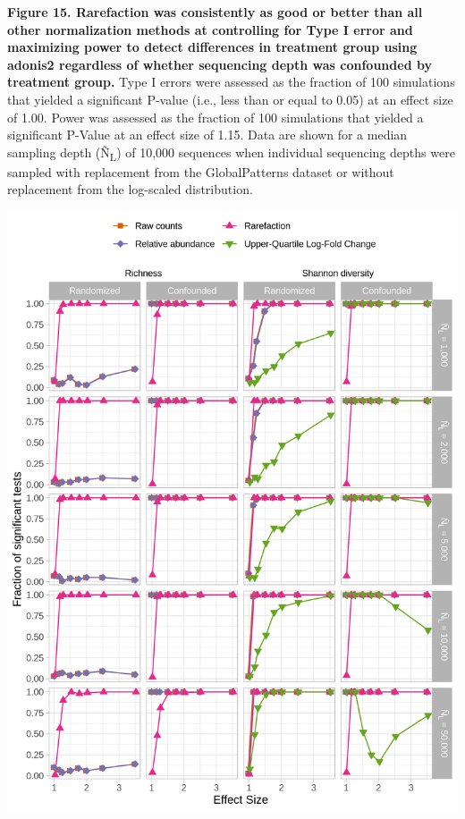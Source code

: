 \documentclass[
]{article}
\begin{document}
\textbf{Figure 15. Rarefaction was consistently as good or better than
all other normalization methods at controlling for Type I error and
maximizing power to detect differences in treatment group using adonis2
regardless of whether sequencing depth was confounded by treatment
group.} Type I errors were assessed as the fraction of 100 simulations
that yielded a significant P-value (i.e., less than or equal to 0.05) at
an effect size of 1.00. Power was assessed as the fraction of 100
simulations that yielded a significant P-Value at an effect size of
1.15. Data are shown for a median sampling depth (Ñ\textsubscript{L}) of
10,000 sequences when individual sequencing depths were sampled with
replacement from the GlobalPatterns dataset or without replacement from
the log-scaled distribution.

\newpage

\includegraphics{figure_16.png}
\end{document}
